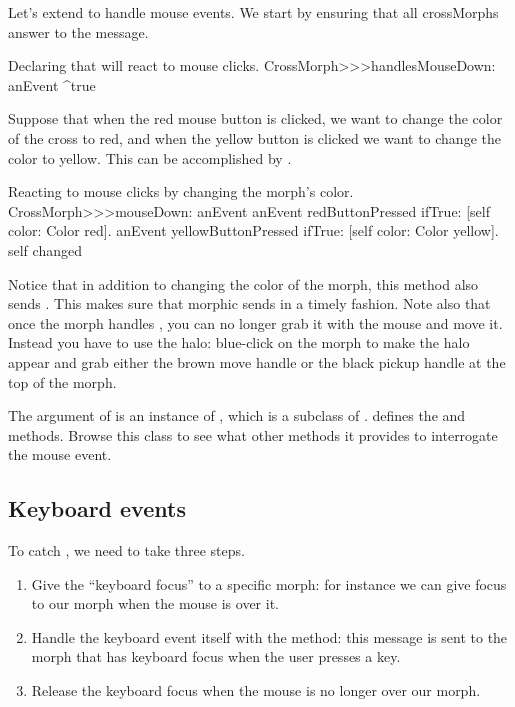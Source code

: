 \documentclass[a4paper,10pt,twoside]{book}
\begin{document}
Let's extend  to handle mouse events.  
We start by ensuring that all crossMorphs answer  to the  message. 

\begin{method}{Declaring that  will react to mouse clicks.}
CrossMorph>>>handlesMouseDown: anEvent
	^true
\end{method}

Suppose that when the red mouse button is clicked, we want to change the color of the cross to red, and when the yellow button is clicked we want to change the color to yellow.
This can be accomplished by .

\begin{method}[mouseDown]{Reacting to mouse clicks by changing the morph's color.}
CrossMorph>>>mouseDown: anEvent
	anEvent redButtonPressed
		ifTrue: [self color: Color red].
	anEvent yellowButtonPressed
		ifTrue: [self color: Color yellow].
	self changed
\end{method}

Notice that in addition to changing the color of the morph, this method also sends .
This makes sure that morphic sends  in a timely fashion.
Note also that once the morph handles , you can no longer grab it with the mouse and move it.
Instead you have to use the halo: blue-click on the morph to make the halo appear and grab either the brown move handle \moveHandle{} or the black pickup handle \grabHandle{} at the top of the morph.

The  argument of  is an instance of \mbox{,} which is a subclass of .  defines the  and  methods. Browse this class to see what other methods it provides to interrogate the mouse event.

\subsection{Keyboard events}

To catch , we need to take three steps.
\begin{enumerate}
	\item Give the ``keyboard focus'' to a specific morph: for instance we can give focus to our morph when the mouse is over it.
	\item Handle the keyboard event itself with the  method: this message is sent to the morph that has keyboard focus when the user presses a key.
	\item Release the keyboard focus when the mouse is no longer over our morph.
\end{enumerate}
\end{document}
